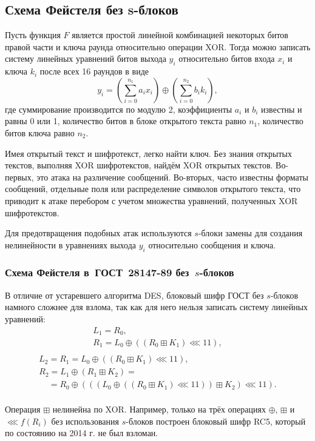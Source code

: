﻿\subsection{Схема Фейстеля без s-блоков}

Пусть функция $F$ является простой линейной комбинацией некоторых битов правой части и ключа раунда относительно операции XOR. Тогда можно записать систему линейных уравнений битов выхода $y_i$ относительно битов входа $x_i$ и ключа $k_i$ после всех 16 раундов в виде
    \[ y_i = (\sum_{i=0}^{n_1} a_i x_i) \oplus (\sum_{i=0}^{n_2} b_i k_i), \]
где суммирование производится по модулю 2, коэффициенты $a_i$ и $b_i$ известны и равны 0 или 1, количество битов в блоке открытого текста равно $n_1$, количество битов ключа равно $n_2$.

Имея открытый текст и шифротекст, легко найти ключ. Без знания открытых текстов, выполняя XOR шифротекстов, найдём XOR открытых текстов. Во-первых, это атака на различение сообщений. Во-вторых, часто известны форматы сообщений, отдельные поля или распределение символов открытого текста, что приводит к атаке перебором с учетом множества уравнений, полученных XOR шифротекстов.

Для предотвращения подобных атак используются $s$-блоки замены для создания нелинейности в уравнениях выхода $y_i$ относительно сообщения и ключа.


\subsubsection[Схема Фейстеля в ГОСТ 28147-89 без $s$-блоков]{Схема Фейстеля в~ГОСТ~28147-89 без~$s$-блоков}

В отличие от устаревшего алгоритма DES, блоковый шифр ГОСТ без $s$-блоков намного сложнее для взлома, так как для него нельзя записать систему линейных уравнений:
\[
    \begin{array}{l}
        L_1 = R_0, \\
        R_1 = L_0 \oplus ((R_0 \boxplus K_1) \lll 11), \\
    \end{array}
\] \[
    \begin{array}{l}
        L_2 = R_1 = L_0 \oplus ((R_0 \boxplus K_1) \lll 11), \\
        R_2 = L_1 \oplus (R_1 \boxplus K_2)  = \\
        ~~~~~= R_0 \oplus (((L_0 \oplus ((R_0 \boxplus K_1) \lll 11)) \boxplus K_2) \lll 11). \\
    \end{array}
\]

Операция $\boxplus$ нелинейна по XOR. Например, только на трёх операциях $\oplus$, $\boxplus$ и $\lll f(R_i)$ без использования $s$-блоков построен блоковый шифр RC5, который по состоянию на  2014 г. не был взломан.
